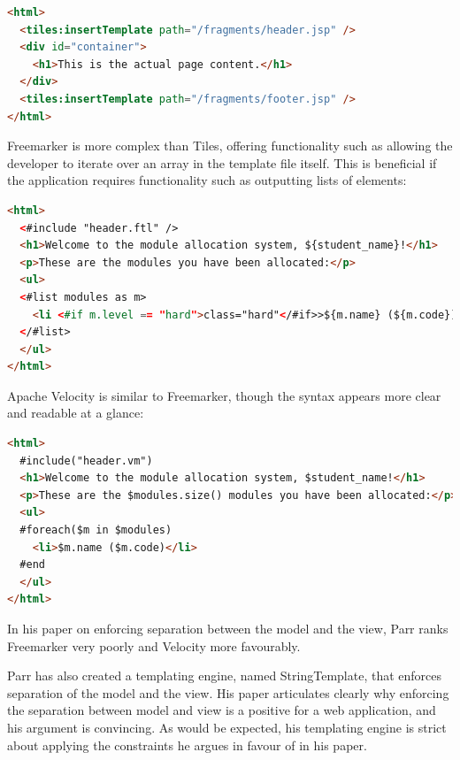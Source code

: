 \documentclass[]{scrartcl}
\begin{document}
\begin{lstlisting}[language=HTML]
<html>
  <tiles:insertTemplate path="/fragments/header.jsp" />
  <div id="container">
    <h1>This is the actual page content.</h1>
  </div>
  <tiles:insertTemplate path="/fragments/footer.jsp" />
</html>
\end{lstlisting}


Freemarker is more complex than Tiles, offering functionality such as allowing
the developer to iterate over an array in the template file itself. This is
beneficial if the application requires functionality such as outputting lists
of elements:

\begin{lstlisting}[language=HTML]
<html>
  <#include "header.ftl" />
  <h1>Welcome to the module allocation system, ${student_name}!</h1>
  <p>These are the modules you have been allocated:</p>
  <ul>
  <#list modules as m>
    <li <#if m.level == "hard">class="hard"</#if>>${m.name} (${m.code})</li>
  </#list>
  </ul>
</html>
\end{lstlisting}


Apache Velocity is similar to Freemarker, though the syntax appears more clear
and readable at a glance:

\begin{lstlisting}[language=HTML]
<html>
  #include("header.vm")
  <h1>Welcome to the module allocation system, $student_name!</h1>
  <p>These are the $modules.size() modules you have been allocated:</p>
  <ul>
  #foreach($m in $modules)
    <li>$m.name ($m.code)</li>
  #end
  </ul>
</html>
\end{lstlisting}

In his paper on enforcing separation between the model and the view, Parr
\cite{Parr2004templateengines} ranks Freemarker very poorly and Velocity more
favourably.


Parr has also created a templating engine, named StringTemplate, that enforces
separation of the model and the view. His paper articulates clearly why
enforcing the separation between model and view is a positive for a web
application, and his argument is convincing. As would be expected, his
templating engine is strict about applying the constraints he argues in favour
of in his paper.

\end{document}
